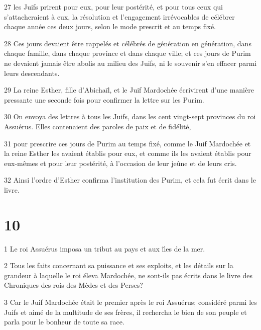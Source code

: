 \par 27 les Juifs prirent pour eux, pour leur postérité, et pour tous ceux qui s'attacheraient à eux, la résolution et l'engagement irrévocables de célébrer chaque année ces deux jours, selon le mode prescrit et au temps fixé.
\par 28 Ces jours devaient être rappelés et célébrés de génération en génération, dans chaque famille, dans chaque province et dans chaque ville; et ces jours de Purim ne devaient jamais être abolis au milieu des Juifs, ni le souvenir s'en effacer parmi leurs descendants.
\par 29 La reine Esther, fille d'Abichaïl, et le Juif Mardochée écrivirent d'une manière pressante une seconde fois pour confirmer la lettre sur les Purim.
\par 30 On envoya des lettres à tous les Juifs, dans les cent vingt-sept provinces du roi Assuérus. Elles contenaient des paroles de paix et de fidélité,
\par 31 pour prescrire ces jours de Purim au temps fixé, comme le Juif Mardochée et la reine Esther les avaient établis pour eux, et comme ils les avaient établis pour eux-mêmes et pour leur postérité, à l'occasion de leur jeûne et de leurs cris.
\par 32 Ainsi l'ordre d'Esther confirma l'institution des Purim, et cela fut écrit dans le livre.

\chapter{10}

\par 1 Le roi Assuérus imposa un tribut au pays et aux îles de la mer.
\par 2 Tous les faits concernant sa puissance et ses exploits, et les détails sur la grandeur à laquelle le roi éleva Mardochée, ne sont-ils pas écrits dans le livre des Chroniques des rois des Mèdes et des Perses?
\par 3 Car le Juif Mardochée était le premier après le roi Assuérus; considéré parmi les Juifs et aimé de la multitude de ses frères, il rechercha le bien de son peuple et parla pour le bonheur de toute sa race.


